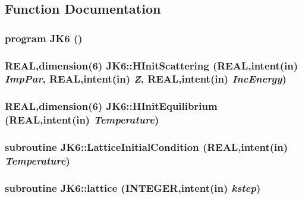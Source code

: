 \subsection{Function Documentation}
\hypertarget{_main_8f90_a7234142162bdb9b2e94af0202102fa71}{
\subsubsection[{JK6}]{\setlength{\rightskip}{0pt plus 5cm}program JK6 ()}}
\label{_main_8f90_a7234142162bdb9b2e94af0202102fa71}
\hypertarget{_main_8f90_a9bf5d0b0b36e79732b8d6cc3787194f3}{
\subsubsection[{HInitScattering}]{\setlength{\rightskip}{0pt plus 5cm}REAL,dimension(6) JK6::HInitScattering (REAL,intent(in) {\em ImpPar}, \/  REAL,intent(in) {\em Z}, \/  REAL,intent(in) {\em IncEnergy})}}
\label{_main_8f90_a9bf5d0b0b36e79732b8d6cc3787194f3}
\hypertarget{_main_8f90_a35604374e5cff380321c1eb4d5a7170d}{
\subsubsection[{HInitEquilibrium}]{\setlength{\rightskip}{0pt plus 5cm}REAL,dimension(6) JK6::HInitEquilibrium (REAL,intent(in) {\em Temperature})}}
\label{_main_8f90_a35604374e5cff380321c1eb4d5a7170d}
\hypertarget{_main_8f90_aae431a18d6b2c93e480cf3119865a6ce}{
\subsubsection[{LatticeInitialCondition}]{\setlength{\rightskip}{0pt plus 5cm}subroutine JK6::LatticeInitialCondition (REAL,intent(in) {\em Temperature})}}
\label{_main_8f90_aae431a18d6b2c93e480cf3119865a6ce}
\hypertarget{_main_8f90_ae10c016023dc8faa80bff5390d4723be}{
\subsubsection[{lattice}]{\setlength{\rightskip}{0pt plus 5cm}subroutine JK6::lattice (INTEGER,intent(in) {\em kstep})}}
